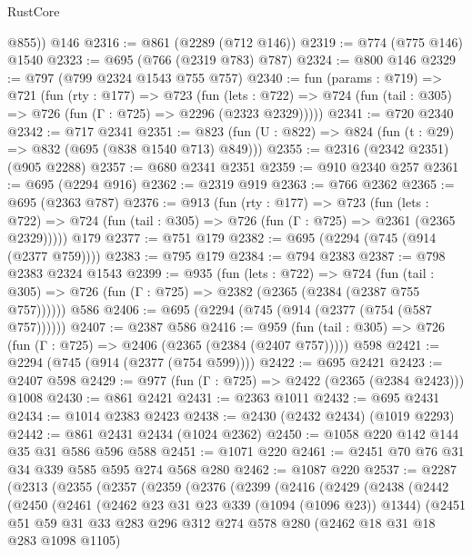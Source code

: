 \begin{lexlean}{RustCore}
\begin{coremodule}
{\begin{coremodule}
{{{{{{{{{        @855))
    @146
@2316 := @861 (@2289 (@712 @146))
@2319 := @774 (@775 @146) @1540
@2323 := @695 (@766 (@2319 @783) @787)
@2324 := @800 @146
@2329 := @797 (@799 @2324 @1543 @755 @757)
@2340 := fun (params : @719) =>
  @721
    (fun (rty : @177) =>
    @723
      (fun (lets : @722) =>
      @724 (fun (tail : @305) => @726 (fun (Γ : @725) => @2296 (@2323 @2329)))))
@2341 := @720 @2340
@2342 := @717 @2341
@2351 := @823 (fun (U : @822) => @824 (fun (t : @29) => @832 (@695 (@838 @1540 @713) @849)))
@2355 := @2316 (@2342 @2351) (@905 @2288)
@2357 := @680 @2341 @2351
@2359 := @910 @2340 @257
@2361 := @695 (@2294 @916)
@2362 := @2319 @919
@2363 := @766 @2362
@2365 := @695 (@2363 @787)
@2376 := @913
    (fun (rty : @177) =>
    @723
      (fun (lets : @722) =>
      @724 (fun (tail : @305) => @726 (fun (Γ : @725) => @2361 (@2365 @2329)))))
    @179
@2377 := @751 @179
@2382 := @695 (@2294 (@745 (@914 (@2377 @759))))
@2383 := @795 @179
@2384 := @794 @2383
@2387 := @798 @2383 @2324 @1543
@2399 := @935
    (fun (lets : @722) =>
    @724 (fun (tail : @305) => @726 (fun (Γ : @725) => @2382 (@2365 (@2384 (@2387 @755 @757))))))
    @586
@2406 := @695 (@2294 (@745 (@914 (@2377 (@754 (@587 @757))))))
@2407 := @2387 @586
@2416 := @959
    (fun (tail : @305) => @726 (fun (Γ : @725) => @2406 (@2365 (@2384 (@2407 @757)))))
    @598
@2421 := @2294 (@745 (@914 (@2377 (@754 @599))))
@2422 := @695 @2421
@2423 := @2407 @598
@2429 := @977 (fun (Γ : @725) => @2422 (@2365 (@2384 @2423))) @1008
@2430 := @861 @2421
@2431 := @2363 @1011
@2432 := @695 @2431
@2434 := @1014 @2383 @2423
@2438 := @2430 (@2432 @2434) (@1019 @2293)
@2442 := @861 @2431 @2434 (@1024 @2362)
@2450 := @1058 @220 @142 @144 @35 @31 @586 @596 @588
@2451 := @1071 @220
@2461 := @2451 @70 @76 @31 @34 @339 @585 @595 @274 @568 @280
@2462 := @1087 @220
@2537 := @2287
    (@2313
      (@2355
        (@2357
          (@2359
            (@2376
              (@2399
                (@2416
                  (@2429
                    (@2438
                      (@2442
                        (@2450
                          (@2461
                            (@2462 @23 @31 @23 @339 (@1094 (@1096 @23)) @1344)
                            (@2451
                              @51
                              @59
                              @31
                              @33
                              @283
                              @296
                              @312
                              @274
                              @578
                              @280
                              (@2462 @18 @31 @18 @283 @1098 @1105)
}}}}}}}}}
\end{coremodule}}
\end{coremodule}
\end{lexlean}
